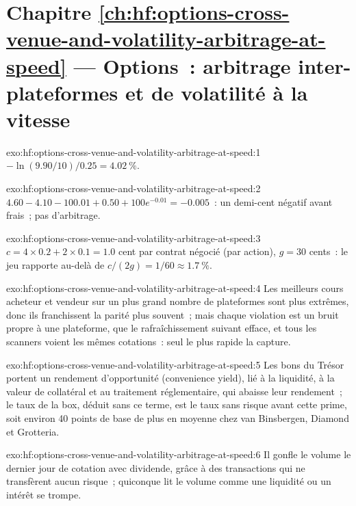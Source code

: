 \section*{Chapitre \ref{ch:hf:options-cross-venue-and-volatility-arbitrage-at-speed} --- Options~: arbitrage inter-plateformes et de volatilité à la vitesse}

\begin{solution}{exo:hf:options-cross-venue-and-volatility-arbitrage-at-speed:1}
$-\ln(9.90/10)/0.25=4.02~\%$.
\end{solution}

\begin{solution}{exo:hf:options-cross-venue-and-volatility-arbitrage-at-speed:2}
$4.60-4.10-100.01+0.50+100e^{-0.01}=-0.005$~: un demi-cent négatif avant frais~; pas d'arbitrage.
\end{solution}

\begin{solution}{exo:hf:options-cross-venue-and-volatility-arbitrage-at-speed:3}
$c=4\times0.2+2\times0.1=1.0$ cent par contrat négocié (par action), $g=30$ cents~: le jeu rapporte au-delà de $c/(2g)=1/60\approx1.7~\%$.
\end{solution}

\begin{solution}{exo:hf:options-cross-venue-and-volatility-arbitrage-at-speed:4}
Les meilleurs cours acheteur et vendeur sur un plus grand nombre de plateformes sont plus extrêmes, donc ils franchissent la parité plus souvent~; mais chaque
violation est un bruit propre à une plateforme, que le rafraîchissement suivant efface, et tous les scanners voient les mêmes cotations~: seul le plus rapide la capture.
\end{solution}

\begin{solution}{exo:hf:options-cross-venue-and-volatility-arbitrage-at-speed:5}
Les bons du Trésor portent un rendement d'opportunité (convenience yield), lié à la liquidité, à la valeur de collatéral et au traitement réglementaire, qui abaisse leur rendement~; le taux de la box, déduit sans
ce terme, est le taux sans risque avant cette prime, soit environ 40 points de base de plus en moyenne chez van Binsbergen, Diamond et Grotteria.
\end{solution}

\begin{solution}{exo:hf:options-cross-venue-and-volatility-arbitrage-at-speed:6}
Il gonfle le volume le dernier jour de cotation avec dividende, grâce à des transactions qui ne transfèrent aucun risque~; quiconque lit le volume comme une liquidité ou un intérêt se trompe.
\end{solution}

